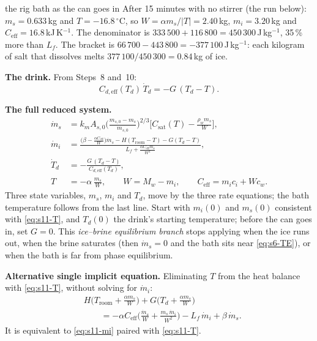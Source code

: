 \documentclass[11pt,a4paper]{article}
\newcommand{\dC}{\,{}^{\circ}\mathrm{C}}
\newcommand{\Troom}{T_{\mathrm{room}}}
\newcommand{\Ceff}{C_{\mathrm{eff}}}
\newcommand{\Cdeff}{C_{d,\mathrm{eff}}}
\newcommand{\Csat}{C_{\mathrm{sat}}}
\newcommand{\para}[1]{\par\smallskip\noindent\textbf{#1}\enspace}
\begin{document}
\begin{worked}{the rig bath as the can goes in}
After 15 minutes with no stirrer (the run below): $m_s = 0.633$\,kg and $T = -16.8\dC$, so
$W = \alpha m_s/|T| = 2.40$\,kg, $m_i = 3.20$\,kg and $\Ceff = 16.8$\,kJ\,K$^{-1}$. The denominator is
$333\,500 + 116\,800 = 450\,300$\,J\,kg$^{-1}$, 35\,\% more than $L_f$. The bracket is
$66\,700 - 443\,800 = -377\,100$\,J\,kg$^{-1}$: each kilogram of salt that dissolves melts
$377\,100/450\,300 = 0.84$\,kg of ice.
\end{worked}

\para{The drink.} From Steps~8 and~10:
\begin{equation}
\Cdeff(T_d)\,\dot T_d = -G\,(T_d - T). \label{eq:s11-drink}
\end{equation}

\para{The full reduced system.}
\begin{equation}
\boxed{
\begin{aligned}
\dot m_s &= k_mA_{s,0}\Big(\frac{m_{s,0} - m_s}{m_{s,0}}\Big)^{2/3}\Big[\Csat(T) - \frac{\rho_wm_s}{W}\Big],\\
\dot m_i &= \frac{\big(\beta - \frac{\alpha\Ceff}{W}\big)\dot m_s - H(\Troom - T) - G(T_d - T)}{L_f + \frac{\alpha\Ceff m_s}{W^2}},\\
\dot T_d &= -\frac{G\,(T_d - T)}{\Cdeff(T_d)},\\
T &= -\alpha\,\frac{m_s}{W},\qquad W = M_w - m_i,\qquad \Ceff = m_ic_i + Wc_w .
\end{aligned}}
\label{eq:s11-system}
\end{equation}
Three state variables, $m_s$, $m_i$ and $T_d$, move by the three rate equations; the bath temperature follows
from the last line. Start with $m_i(0)$ and $m_s(0)$ consistent with \eqref{eq:s11-T}, and $T_d(0)$ the
drink's starting temperature; before the can goes in, set $G = 0$. This \emph{ice--brine equilibrium branch}
stops applying when the ice runs out, when the brine saturates (then $\dot m_s = 0$ and the bath sits near
\eqref{eq:s6-TE}), or when the bath is far from phase equilibrium.

\para{Alternative single implicit equation.} Eliminating $T$ from the heat balance with \eqref{eq:s11-T},
without solving for $\dot m_i$:
\begin{equation}
\begin{split}
&H\Big(\Troom + \frac{\alpha m_s}{W}\Big) + G\Big(T_d + \frac{\alpha m_s}{W}\Big)\\
&\qquad= -\alpha\Ceff\Big(\frac{\dot m_s}{W} + \frac{m_s\,\dot m_i}{W^2}\Big) - L_f\,\dot m_i + \beta\,\dot m_s .
\end{split}
\label{eq:s11-implicit}
\end{equation}
It is equivalent to \eqref{eq:s11-mi} paired with \eqref{eq:s11-T}.
\end{document}
